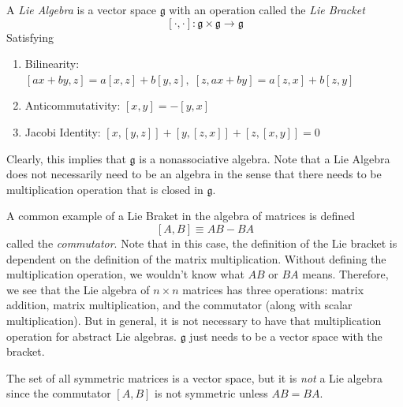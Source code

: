\documentclass{article}
\begin{document}
    \begin{definition}
    A \textit{Lie Algebra} is a vector space $\mathfrak{g}$ with an operation called the \textit{Lie Bracket} 
    \[[\cdot, \cdot]: \mathfrak{g} \times \mathfrak{g} \longrightarrow \mathfrak{g}\]
    Satisfying
    \begin{enumerate}
        \item Bilinearity: $[ax + by, z] = a[x,z] + b[y,z], \; [z, ax + by] = a[z, x] + b[z,y]$
        \item Anticommutativity: $[x,y] = -[y,x]$
        \item Jacobi Identity: $[x,[y,z]] + [y,[z,x]] + [z,[x,y]] = 0$
    \end{enumerate}
    Clearly, this implies that $\mathfrak{g}$ is a nonassociative algebra. Note that a Lie Algebra does not necessarily need to be an algebra in the sense that there needs to be multiplication operation that is closed in $\mathfrak{g}$. 
    \end{definition}

    \begin{example}
    A common example of a Lie Braket in the algebra of matrices is defined
    \[[A, B] \equiv AB - BA\]
    called the \textit{commutator}. Note that in this case, the definition of the Lie bracket is dependent on the definition of the matrix multiplication. Without defining the multiplication operation, we wouldn't know what $AB$ or $BA$ means. Therefore, we see that the Lie algebra of $n \times n$ matrices has three operations: matrix addition, matrix multiplication, and the commutator (along with scalar multiplication). But in general, it is not necessary to have that multiplication operation for abstract Lie algebras. $\mathfrak{g}$ just needs to be a vector space with the bracket.  
    \end{example}

    \begin{example}
    The set of all symmetric matrices is a vector space, but it is \textit{not} a Lie algebra since the commutator $[A,B]$ is not symmetric unless $A B = B A$. 
    \end{example}
\end{document}

